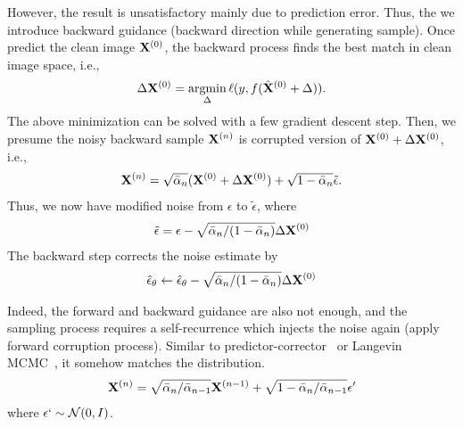 \documentclass[11pt]{article}
\begin{document}
However, the result is unsatisfactory mainly due to prediction error.
Thus, the we introduce backward guidance (backward direction while generating sample).
Once predict the clean image ${\bf X}^{(0)}$, the backward process finds the best match in clean image space, i.e.,
\begin{align}
    \Delta {\bf X}^{(0)} = \mathop{\mbox{{\rm argmin}}}\limits_{\Delta} \ell(y, f(\hat{{\bf X}}^{(0)}+\Delta)). \label{eq:compute Delta bX0}
\end{align}
The above minimization can be solved with a few gradient descent step.
Then, we presume the noisy backward sample ${\bf X}^{(n)}$ is corrupted version of ${\bf X}^{(0)}+\Delta {\bf X}^{(0)}$, i.e.,
\begin{align}
    {\bf X}^{(n)} = \sqrt{\bar{\alpha}_n}({\bf X}^{(0)} + \Delta{\bf X}^{(0)})+\sqrt{1-\bar{\alpha}_n }\tilde{\epsilon}.
\end{align}
Thus, we now have modified noise from $\epsilon$ to $\tilde{\epsilon}$, where
\begin{align}
    \tilde{\epsilon} = \epsilon - \sqrt{\bar{\alpha}_n / (1-\bar{\alpha}_n)} \Delta{\bf X}^{(0)}
\end{align}
The backward step corrects the noise estimate by
\begin{align}
    \hat{\epsilon}_\theta \leftarrow \hat{\epsilon}_{\theta} - \sqrt{\bar{\alpha}_n / (1-\bar{\alpha}_n)} \Delta{\bf X}^{(0)}\label{eq:update score in backward}
\end{align}

Indeed, the forward and backward guidance are also not enough, and the sampling process requires a self-recurrence
which injects the noise again (apply forward corruption process).
Similar to predictor-corrector~\cite[Seciton 4.2]{song2021scorebased} or Langevin MCMC~\cite{welling2011bayesian}, it somehow matches the distribution.
\begin{align}
    {\bf X}^{(n)} = \sqrt{\bar{\alpha}_n / \bar{\alpha}_{n-1}} {\bf X}^{(n-1)} + \sqrt{1-\bar{\alpha}_n/\bar{\alpha}_{n-1}} \epsilon'\label{eq:self recurrence}
\end{align}
where $\epsilon`\sim{\cal N}(0, I)$.
\end{document}
